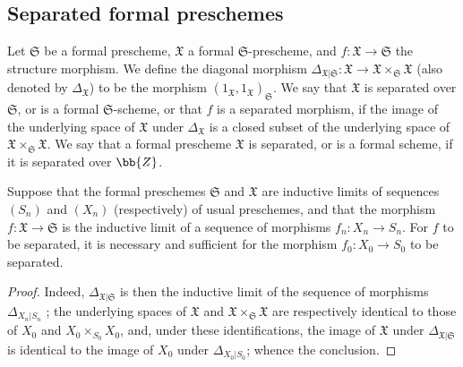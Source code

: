 \subsection{Separated formal preschemes}
\label{subsection:I.10.15}

\begin{definition}[10.15.1]
\label{I.10.15.1}
Let $\mathfrak{S}$ be a formal prescheme, $\mathfrak{X}$ a formal $\mathfrak{S}$-prescheme, and $f:\mathfrak{X}\to\mathfrak{S}$ the structure morphism.
We define the diagonal morphism $\Delta_{\mathfrak{X}|\mathfrak{S}}:\mathfrak{X}\to\mathfrak{X}\times_\mathfrak{S}\mathfrak{X}$ (also denoted by $\Delta_\mathfrak{X}$) to be the morphism $(1_\mathfrak{X},1_\mathfrak{X})_\mathfrak{S}$.
We say that $\mathfrak{X}$ is separated over $\mathfrak{S}$, or is a formal $\mathfrak{S}$-scheme, or that $f$ is a separated morphism, if the image of the underlying space of $\mathfrak{X}$ under $\Delta_\mathfrak{X}$ is a closed subset of the underlying space of $\mathfrak{X}\times_\mathfrak{S}\mathfrak{X}$.
We say that a formal prescheme $\mathfrak{X}$ is separated, or is a formal scheme, if it is separated over $\bb{Z}$.
\end{definition}

\begin{proposition}[10.15.2]
\label{I.10.15.2}
Suppose that the formal preschemes $\mathfrak{S}$ and $\mathfrak{X}$ are inductive limits of sequences $(S_n)$ and $(X_n)$ (respectively) of usual preschemes, and that the morphism $f:\mathfrak{X}\to\mathfrak{S}$ is the inductive limit of a sequence of morphisms $f_n:X_n\to S_n$.
For $f$ to be separated, it is necessary and sufficient for the morphism $f_0:X_0\to S_0$ to be separated.
\end{proposition}

\begin{proof}
Indeed, $\Delta_{\mathfrak{X}|\mathfrak{S}}$ is then the inductive limit of the sequence of morphisms $\Delta_{X_n|S_n}$ ; the underlying spaces of $\mathfrak{X}$ and $\mathfrak{X}\times_\mathfrak{S}\mathfrak{X}$ are respectively identical to those of $X_0$ and $X_0\times_{S_0}X_0$, and, under these identifications, the image of $\mathfrak{X}$ under $\Delta_{\mathfrak{X}|\mathfrak{S}}$ is identical to the image of $X_0$ under $\Delta_{X_0|S_0}$;
whence the conclusion.
\end{proof}

